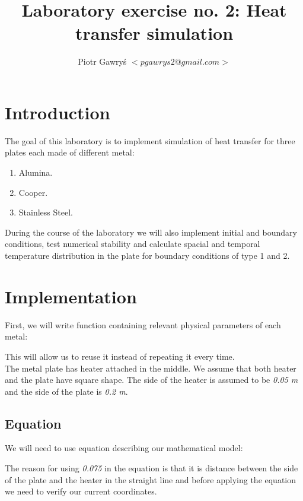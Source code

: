 \documentclass[12pt]{article}
\title{Laboratory exercise no. 2: Heat transfer simulation}
\author{Piotr Gawry\'s $<pgawrys2@gmail.com>$}
\begin{document}
\maketitle

\section{Introduction}

The goal of this laboratory is to implement simulation of heat transfer for three plates each made of different metal:
\begin{enumerate}
	\item Alumina.
	\item Cooper.
	\item Stainless Steel.
\end{enumerate}

During the course of the laboratory we will also implement initial and boundary conditions, test numerical stability and calculate spacial and temporal temperature distribution in the plate for boundary conditions of type 1 and 2.

\section{Implementation}

First, we will write function containing relevant physical parameters of each metal:



This will allow us to reuse it instead of repeating it every time. \\

The metal plate has heater attached in the middle. We assume that both heater and the plate have square shape. The side of the heater is assumed to be \textit{0.05 m} and the side of the plate is \textit{0.2 m}.

\subsection{Equation}

We will need to use equation describing our mathematical model:



The reason for using \textit{0.075} in the equation is that it is distance between the side of the plate and the heater in the straight line and before applying the equation we need to verify our current coordinates.
\end{document}
